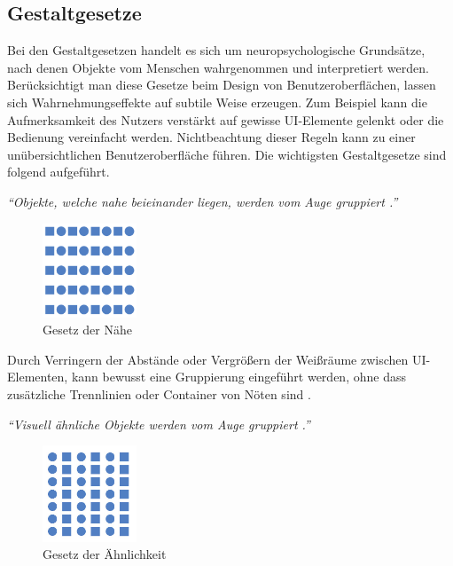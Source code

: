 \subsection{Gestaltgesetze} \label{sec:uidRules}
Bei den Gestaltgesetzen handelt es sich um neuropsychologische Grundsätze, nach denen Objekte vom Menschen wahrgenommen und interpretiert werden. Berücksichtigt man diese Gesetze beim Design von Benutzeroberflächen, lassen sich Wahrnehmungseffekte auf subtile Weise erzeugen. Zum Beispiel kann die Aufmerksamkeit des Nutzers verstärkt auf gewisse UI-Elemente gelenkt oder die Bedienung vereinfacht werden. Nichtbeachtung dieser Regeln kann zu einer unübersichtlichen Benutzeroberfläche führen. Die wichtigsten Gestaltgesetze sind folgend aufgeführt.\par
{}
\textit{\enquote{Objekte, welche nahe beieinander liegen, werden vom Auge gruppiert \cite[S. 186]{Moser2012}.}}\par
\begin{figure}[H]
 \centering
 \includegraphics[width=0.25\textwidth]{grafiken/Gesetz_Naehe.png}
 \caption[Gesetz der Nähe]{Gesetz der Nähe \cite{Schossmann}}
 \label{fig:gesetzNaehe}
\end{figure} 
Durch Verringern der Abstände oder Vergrößern der Weißräume zwischen UI-Elementen, kann bewusst eine Gruppierung eingeführt werden, ohne dass zusätzliche Trennlinien oder Container von Nöten sind \cite[S. 186]{Moser2012}.\par
{}
\textit{\enquote{Visuell ähnliche Objekte werden vom Auge gruppiert \cite[S. 187]{Moser2012}.}}\par
\begin{figure}[H]
 \centering
 \includegraphics[width=0.25\textwidth]{grafiken/Gesetz_Aehnl.png}
 \caption[Gesetz der Ähnlichkeit]{Gesetz der Ähnlichkeit \cite{Grigo}}
 \label{fig:gesetzAehnl}
\end{figure} 

